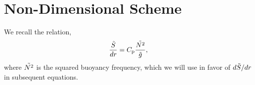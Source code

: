 \documentclass[12pt]{article}
\numberwithin{equation}{section}
\begin{document}
	
	

	
	
	\section{Non-Dimensional Scheme}
	We recall the relation,
	\begin{align}
	\frac{\tilde{S}}{dr} = C_{\rm{p}}\frac{\tilde{N^2}}{\tilde{g}},
	\end{align}
		where $\tilde{N^2}$ is the squared buoyancy frequency, which we will use in favor of $d\tilde{S}/dr$ in subsequent equations.
	
\end{document}
